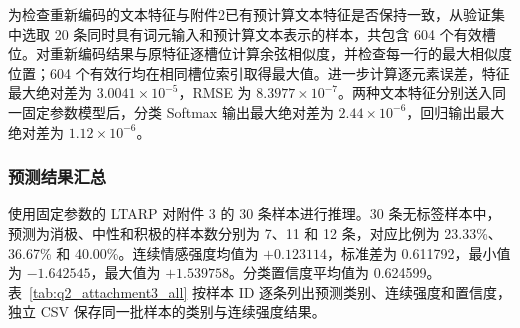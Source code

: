 \documentclass[UTF8,a4paper,11pt]{ctexart}
\begin{document}
为检查重新编码的文本特征与附件2已有预计算文本特征是否保持一致，从验证集中选取 20 条同时具有词元输入和预计算文本表示的样本，共包含 604 个有效槽位。对重新编码结果与原特征逐槽位计算余弦相似度，并检查每一行的最大相似度位置；604 个有效行均在相同槽位索引取得最大值。进一步计算逐元素误差，特征最大绝对差为 $3.0041\times10^{-5}$，RMSE 为 $8.3977\times10^{-7}$。两种文本特征分别送入同一固定参数模型后，分类 Softmax 输出最大绝对差为 $2.44\times10^{-6}$，回归输出最大绝对差为 $1.12\times10^{-6}$。

\subsubsection{预测结果汇总}
使用固定参数的 LTARP 对附件 3 的 30 条样本进行推理。30 条无标签样本中，预测为消极、中性和积极的样本数分别为 7、11 和 12 条，对应比例为 23.33\%、36.67\% 和 40.00\%。连续情感强度均值为 $+0.123114$，标准差为 0.611792，最小值为 $-1.642545$，最大值为 $+1.539758$。分类置信度平均值为 0.624599。表~\ref{tab:q2_attachment3_all} 按样本 ID 逐条列出预测类别、连续强度和置信度，独立 CSV 保存同一批样本的类别与连续强度结果。
\end{document}
